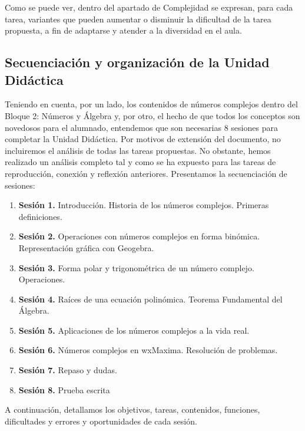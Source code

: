 \documentclass[../main.tex]{memoir}
\begin{document}
Como se puede ver, dentro del apartado de Complejidad se expresan, para cada tarea, variantes que pueden aumentar o disminuir la dificultad de la tarea propuesta, a fin de adaptarse y atender a la diversidad en el aula. 


\subsection{Secuenciación y organización de la Unidad Didáctica}

Teniendo en cuenta, por un lado, los contenidos de números complejos dentro del Bloque 2: Números y Álgebra y, por otro, el hecho de que todos los conceptos son novedosos para el alumnado, entendemos que son necesarias 8 sesiones para completar la Unidad Didáctica. Por motivos de extensión del documento, no incluiremos el análisis de todas las tareas propuestas. No obstante, hemos realizado un análisis completo tal y como se ha expuesto para las tareas de reproducción, conexión y reflexión anteriores. Presentamos la secuenciación de sesiones:

\begin{enumerate}
	\item \textbf{Sesión 1.} Introducción. Historia de los números complejos. Primeras definiciones.
	\item \textbf{Sesión 2.} Operaciones con números complejos en forma binómica. Representación gráfica con Geogebra.
	\item \textbf{Sesión 3.} Forma polar y trigonométrica de un número complejo. Operaciones.
	\item \textbf{Sesión 4.} Raíces de una ecuación polinómica. Teorema Fundamental del Álgebra.
	\item \textbf{Sesión 5.} Aplicaciones de los números complejos a la vida real.
	\item \textbf{Sesión 6.} Números complejos en wxMaxima. Resolución de problemas.
	\item \textbf{Sesión 7.} Repaso y dudas.
	\item \textbf{Sesión 8.} Prueba escrita
\end{enumerate}

A continuación, detallamos los objetivos, tareas, contenidos, funciones, dificultades y errores y oportunidades de cada sesión.
\end{document}
